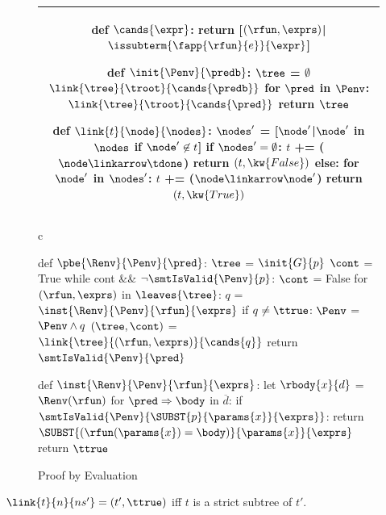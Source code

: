 \begin{figure}[thp]
\centering
\begin{tabular}{c}  %
\toprule
\begin{code2}
def $\cands{\expr}$:
  return [$(\rfun, \exprs)$|$\issubterm{\fapp{\rfun}{e}}{\expr}$]

def $\init{\Penv}{\predb}$:
  $\tree$ = $\emptyset$
  $\link{\tree}{\troot}{\cands{\predb}}$
  for $\pred$ in $\Penv$:
    $\link{\tree}{\troot}{\cands{\pred}}$
  return $\tree$

def $\link{t}{\node}{\nodes}$:
  $\nodes'$ = [$\node'$|$\node'$ in $\nodes$ if $\node' \not \in t$]
  if $\nodes' = \emptyset$:
    $t$ += ($\node \linkarrow \tdone$)
    return $(t,\kw{False})$
  else:
    for $\node'$ in $\nodes'$:
      $t$ += ($\node \linkarrow \node'$)
      return $(t,\kw{True})$
\end{code2}
\tabularnewline \bottomrule
\end{tabular}
\caption{}
\label{fig:code-label}
\end{figure}

\begin{figure}[t]
\begin{center}
\begin{tabular}{c}
\toprule
\begin{code2}
def $\pbe{\Renv}{\Penv}{\pred}$:
  $\tree$ = $\init{G}{p}$
  $\cont$ = True
  while cont && $\neg \smtIsValid{\Penv}{p}$:
    $\cont$ = False
    for $(\rfun, \exprs)$ in $\leaves{\tree}$:
      $q$ = $\inst{\Renv}{\Penv}{\rfun}{\exprs}$
      if $q \not = \ttrue$:
        $\Penv$ = $\Penv \wedge q$
        $(\tree, \cont)$ = $\link{\tree}{(\rfun, \exprs)}{\cands{q}}$
  return $\smtIsValid{\Penv}{\pred}$

def $\inst{\Renv}{\Penv}{\rfun}{\exprs}$:
  let $\rbody{x}{d}$ = $\Renv(\rfun)$
  for $\pred \Rightarrow \body$ in $\overline{d}$:
    if $\smtIsValid{\Penv}{\SUBST{p}{\params{x}}{\exprs}}$:
      return $\SUBST{(\rfun(\params{x}) = \body)}{\params{x}}{\exprs}$
  return $\ttrue$
\end{code2}
\tabularnewline \bottomrule
\end{tabular}
\end{center}
\caption{Proof by Evaluation}
\label{fig:pbe}
\label{fig:inst}
\end{figure}

\begin{lemma}\label{lem:link}
$\link{t}{n}{{ns'}} = (t', \ttrue)$
iff
$t$ is a strict subtree of $t'$.
\end{lemma}

